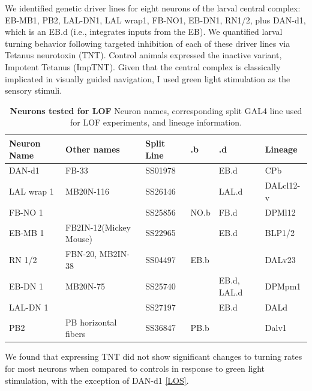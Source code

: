     We identified genetic driver lines for eight neurons of the larval central complex: EB-MB1, PB2, LAL-DN1, LAL wrap1, FB-NO1, EB-DN1, RN1/2, plus DAN-d1, which is an EB.d (i.e., integrates inputs from the EB). 
    We quantified larval turning behavior following targeted inhibition of each of these driver lines via Tetanus neurotoxin (TNT).
    Control animals expressed the inactive variant, Impotent Tetanus (ImpTNT).
    Given that the central complex is classically implicated in visually guided navigation, I used green light stimulation as the sensory stimuli.
     \begin{table}[h!]
    \centering
    \begin{tabular}{llllll}
    \toprule
    \textbf{Neuron Name} & \textbf{Other names} & \textbf{Split Line} & \textbf{.b} & \textbf{.d} & \textbf{Lineage} \\ 
    \midrule
    DAN-d1      &   FB-33         & SS01978 &       & EB.d        & CPb        \\ 
    LAL wrap 1  & MB20N-116       & SS26146 &       & LAL.d       &  DALcl12-v  \\ 
    FB-NO 1     &                 & SS25856 & NO.b  & FB.d        &  DPMl12    \\ 
    EB-MB 1     & FB2IN-12(Mickey Mouse)& SS22965 &       & EB.d    & BLP1/2    \\ 
    RN 1/2      & FBN-20, MB2IN-38 & SS04497 & EB.b  &             &  DALv23    \\ 
    EB-DN 1     & MB20N-75        & SS25740 &       & EB.d, LAL.d & DPMpm1 \\ 
    LAL-DN 1    &                 & SS27197 &       & EB.d            & DALd   \\ 
    PB2         & PB horizontal fibers & SS36847 & PB.b      &             & Dalv1  \\ 
    \bottomrule
    \end{tabular}
    \caption{ \textbf{Neurons tested for LOF} Neuron names, corresponding split GAL4 line used for LOF experiments, and lineage information.}
    \end{table}

    We found that expressing TNT did not show significant changes to turning rates for most neurons when compared to controls in response to green light stimulation, with the exception of DAN-d1 \ref{LOS}. 



